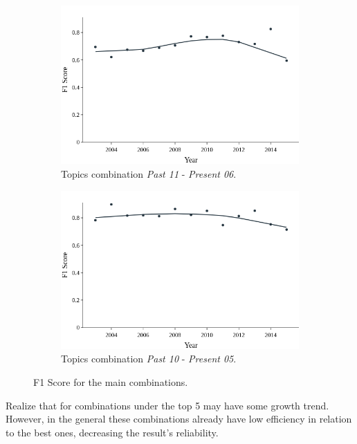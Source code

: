 \begin{figure}[h!]
	\begin{subfigure}{0.5\textwidth}
	\includegraphics[width=\linewidth]{01.Chapters/05.Results/lowess-1}
		\caption{Topics combination \textit{Past 11} - \textit{Present 06}.}
	\end{subfigure}%
	\hfill
	\begin{subfigure}{0.5\textwidth}
		\includegraphics[width=\linewidth]{01.Chapters/05.Results/lowess-2}
		\caption{Topics combination \textit{Past 10} - \textit{Present 05}.}
	\end{subfigure}%
	\caption{F1 Score for the main combinations.}
	\label{fig:isolated-topics}
\end{figure}

Realize that for combinations under the top 5 may have some growth trend. However, in the general these combinations already have low efficiency in relation to the best ones, decreasing the result's reliability.


